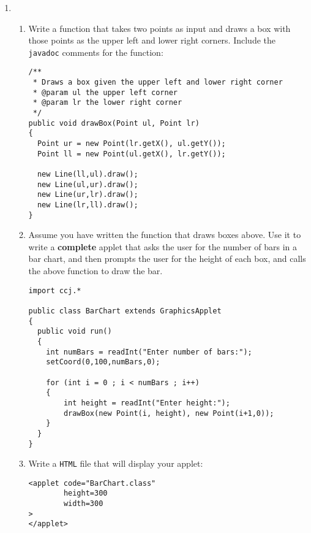 \begin{enumerate}
\begin{enumerate}
\begin{verbatim}
#import ccj.*

public class GradeConvert
{
  public static void main(String[] arg)
  {
    // Ask user for letter grade:
    System.out.print("Please enter letter grade: ");
    String letterGrade = Console.in.readWord();

    // Print out number grade:
    System.out.println("\nThe number grade is " + convert(letterGrade));
  }
}
\end{verbatim}
		\end{enumerate}

	\item
		\begin{enumerate}
			\item Write a function that takes two points as
			input and draws a box with
				those points as the upper left and lower
				right corners.	Include the {\tt javadoc}
				comments for the function:

\begin{verbatim}
/**
 * Draws a box given the upper left and lower right corner
 * @param ul the upper left corner
 * @param lr the lower right corner
 */
public void drawBox(Point ul, Point lr)
{
  Point ur = new Point(lr.getX(), ul.getY());
  Point ll = new Point(ul.getX(), lr.getY());
  
  new Line(ll,ul).draw();
  new Line(ul,ur).draw();
  new Line(ur,lr).draw();
  new Line(lr,ll).draw();
}
\end{verbatim}
			\item Assume you have written the function that
			draws boxes above.
				Use it to write a {\bf complete} applet
				that asks the user for the number of
				bars in a bar chart, and then prompts
				the user for the height of each box, and
				calls the above function to draw the bar.
\begin{verbatim}
import ccj.*

public class BarChart extends GraphicsApplet
{
  public void run()
  {
    int numBars = readInt("Enter number of bars:");
    setCoord(0,100,numBars,0);
    
    for (int i = 0 ; i < numBars ; i++)
    {
        int height = readInt("Enter height:");
        drawBox(new Point(i, height), new Point(i+1,0));
    }
  }
}
\end{verbatim}

			\item Write a {\tt HTML} file that will display
			your applet:
\begin{verbatim}
<applet code="BarChart.class"
        height=300
        width=300
>
</applet>
\end{verbatim}


\end{enumerate}
\end{enumerate}
